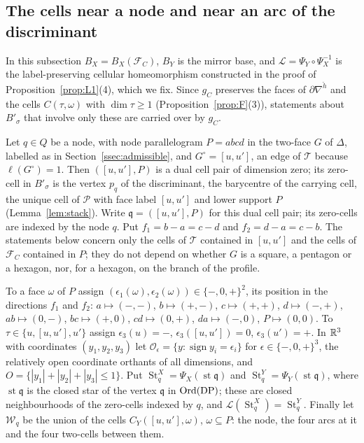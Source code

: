 \subsection{The cells near a node and near an arc of the discriminant}\label{ssec:leg-node}
In this subsection $B_X=B_X(\mathcal F_C)$, $B_Y$ is the mirror base, and $\mathcal L=\Psi_Y\circ\Psi_X^{-1}$ is the
label-preserving cellular homeomorphism constructed in the proof of Proposition~\ref{prop:L1}(4), which we fix. Since $g_C$ preserves the faces of
$\partial\nabla^{\check h}$ and the cells $C(\tau,\omega)$ with $\dim\tau\ge1$ (Proposition~\ref{prop:F}(3)), statements
about $B'_\sigma$ that involve only these are carried over by $g_C$.

Let $q\in Q$ be a node, with node parallelogram $P=abcd$ in the two-face $G$ of $\Delta$, labelled as in
Section~\ref{ssec:admissible}, and $G^\circ=[u,u']$, an edge of $\mathcal T$ because $\ell(G^\circ)=1$. Then
$([u,u'],P)$ is a dual cell pair of dimension zero; its zero-cell in $B'_\sigma$ is the vertex $p_q$ of the discriminant, the barycentre of the
carrying cell, the unique cell of $\mathscr P$ with face label $[u,u']$ and lower support $P$ (Lemma~\ref{lem:stack}).
Write ${\mathfrak q}=([u,u'],P)$ for this dual cell pair; its zero-cells are indexed by the node $q$. Put $f_1=b-a=c-d$ and $f_2=d-a=c-b$. The statements
below concern only the cells of $\mathcal T$ contained in $[u,u']$ and the cells of $\mathcal F_C$ contained in $P$; they do
not depend on whether $G$ is a square, a pentagon or a hexagon, nor, for a hexagon, on the branch of the profile.

To a face $\omega$ of $P$ assign $(\epsilon_1(\omega),\epsilon_2(\omega))\in\{-,0,+\}^2$, its position in the directions
$f_1$ and $f_2$: $a\mapsto(-,-)$, $b\mapsto(+,-)$, $c\mapsto(+,+)$, $d\mapsto(-,+)$, $ab\mapsto(0,-)$, $bc\mapsto(+,0)$,
$cd\mapsto(0,+)$, $da\mapsto(-,0)$, $P\mapsto(0,0)$. To $\tau\in\{u,[u,u'],u'\}$ assign $\epsilon_3(u)=-$,
$\epsilon_3([u,u'])=0$, $\epsilon_3(u')=+$. In $\mathbb R^3$ with coordinates $(y_1,y_2,y_3)$ let
$\mathcal O_\epsilon=\{y:\operatorname{sign}y_i=\epsilon_i\}$ for $\epsilon\in\{-,0,+\}^3$, the relatively open coordinate
orthants of all dimensions, and $O=\{|y_1|+|y_2|+|y_3|\le1\}$. Put $\operatorname{St}^X_q=\Psi_X(\operatorname{st}{\mathfrak q})$ and
$\operatorname{St}^Y_q=\Psi_Y(\operatorname{st}{\mathfrak q})$, where $\operatorname{st}{\mathfrak q}$ is the closed star of the vertex ${\mathfrak q}$ in
$\operatorname{Ord}(\mathrm{DP})$; these are closed neighbourhoods of the zero-cells indexed by $q$, and $\mathcal L(\operatorname{St}^X_q)=\operatorname{St}^Y_q$.
Finally let $\mathcal W_q$ be the union of the cells $C_Y([u,u'],\omega)$, $\omega\subseteq P$: the node, the four arcs at it
and the four two-cells between them.

